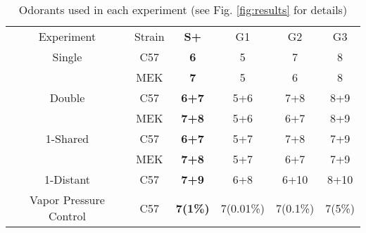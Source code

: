 \label{tab:design}
\begin{table}
    \begin{tabular}{ c c c c c c }
        Experiment & Strain & \textbf{S+} & G1 & G2 & G3 \\ 
        Single & C57 & \textbf{6} & 5 & 7 & 8 &   \\ 
         & MEK & \textbf{7} & 5 & 6 & 8 &  \\ 
        Double & C57 & \textbf{6+7} & 5+6 & 7+8 & 8+9 &    \\ 
         & MEK & \textbf{7+8} & 5+6 & 6+7 & 8+9 &   \\ 
        1-Shared & C57 & \textbf{6+7} & 5+7 & 7+8 & 7+9 &  \\ 
         & MEK & \textbf{7+8} & 5+7 & 6+7 & 7+9 &   \\ 
        1-Distant & C57 & \textbf{7+9} & 6+8 & 6+10 & 8+10 &    \\ 
        Vapor Pressure Control & C57 & \textbf{7(1\%)} & 7(0.01\%) & 7(0.1\%) & 7(5\%) &   \\ 
    \end{tabular}
    \caption{Odorants used in each experiment (see Fig. \ref{fig:results} for details)}
\end{table}